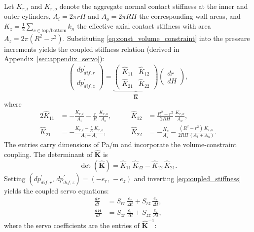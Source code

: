 \documentclass[a4paper,fleqn]{cas-sc}
\begin{document}
Let $K_{r,i}$ and $K_{r,o}$ denote the aggregate normal contact stiffness at the inner and outer cylinders, $A_i=2\pi rH$ and $A_o=2\pi RH$ the corresponding wall areas, and $K_z=\frac{1}{2}\sum_{c\in\mathrm{top/bottom}} k_n$ the effective axial contact stiffness with area $A_z=2\pi(R^2-r^2)$. Substituting \cref{eq:const_volume_constraint} into the pressure increments yields the coupled stiffness relation (derived in Appendix~\ref{sec:appendix_servo}):
\begin{equation}
\begin{pmatrix} dp_{dif,r}^{\prime} \\[4pt] dp_{dif,z}^{\prime} \end{pmatrix}
=
\underbrace{\begin{pmatrix} \hat{K}_{11} & \hat{K}_{12} \\[6pt] \hat{K}_{21} & \hat{K}_{22} \end{pmatrix}}_{\hat{\mathbf{K}}}
\begin{pmatrix} dr \\[4pt] dH \end{pmatrix},
\label{eq:coupled_stiffness}
\end{equation}
where
\begin{alignat}{2}
\hat{K}_{11} &= -\frac{K_{r,i}}{A_i}-\frac{r}{R}\,\frac{K_{r,o}}{A_o}, &\qquad
\hat{K}_{12} &= \frac{R^2-r^2}{2RH}\,\frac{K_{r,o}}{A_o}, \label{eq:Khat_main_row1}\\[4pt]
\hat{K}_{21} &= -\frac{K_{r,i}-\frac{r}{R}\,K_{r,o}}{A_i+A_o}, &\qquad
\hat{K}_{22} &= -\frac{K_z}{A_z}-\frac{(R^2-r^2)\,K_{r,o}}{2RH\,(A_i+A_o)}. \label{eq:Khat_main_row2}
\end{alignat}
The entries carry dimensions of Pa/m and incorporate the volume-constraint coupling. The determinant of $\hat{\mathbf{K}}$ is
\begin{equation}
\det(\hat{\mathbf{K}}) = \hat{K}_{11}\,\hat{K}_{22} - \hat{K}_{12}\,\hat{K}_{21}.
\label{eq:det_K_main}
\end{equation}
Setting $(dp_{dif,r}^{\prime},\,dp_{dif,z}^{\prime})=(-e_r,\,-e_z)$ and inverting \cref{eq:coupled_stiffness} yields the coupled servo equations:
\begin{align}
\frac{dr}{dt} &= S_{rr}\,\frac{e_r}{\Delta t} + S_{rz}\,\frac{e_z}{\Delta t}, \label{eq:servo_dr}\\[6pt]
\frac{dH}{dt} &= S_{zr}\,\frac{e_r}{\Delta t} + S_{zz}\,\frac{e_z}{\Delta t}, \label{eq:servo_dH}
\end{align}
where the servo coefficients are the entries of $\hat{\mathbf{K}}^{-1}$:
\end{document}
